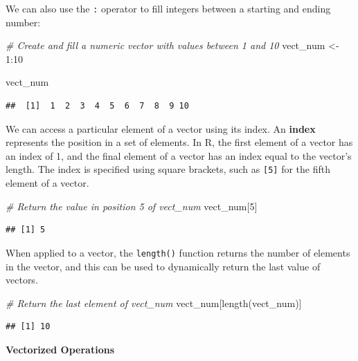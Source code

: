 \documentclass[
]{book}
\newenvironment{Shaded}{\begin{snugshade}}{\end{snugshade}}
\newcommand{\CommentTok}[1]{\textcolor[rgb]{0.56,0.35,0.01}{\textit{#1}}}
\newcommand{\DecValTok}[1]{\textcolor[rgb]{0.00,0.00,0.81}{#1}}
\newcommand{\FunctionTok}[1]{\textcolor[rgb]{0.00,0.00,0.00}{#1}}
\newcommand{\NormalTok}[1]{#1}
\newcommand{\OtherTok}[1]{\textcolor[rgb]{0.56,0.35,0.01}{#1}}
\newcommand{\SpecialCharTok}[1]{\textcolor[rgb]{0.00,0.00,0.00}{#1}}
\begin{document}
We can also use the \texttt{:} operator to fill integers between a starting and ending number:

\begin{Shaded}
\begin{Highlighting}[]
\CommentTok{\# Create and fill a numeric vector with values between 1 and 10}
\NormalTok{vect\_num }\OtherTok{\textless{}{-}} \DecValTok{1}\SpecialCharTok{:}\DecValTok{10}

\NormalTok{vect\_num}
\end{Highlighting}
\end{Shaded}

\begin{verbatim}
##  [1]  1  2  3  4  5  6  7  8  9 10
\end{verbatim}

We can access a particular element of a vector using its index. An \textbf{index} represents the position in a set of elements. In R, the first element of a vector has an index of 1, and the final element of a vector has an index equal to the vector's length. The index is specified using square brackets, such as \texttt{{[}5{]}} for the fifth element of a vector.

\begin{Shaded}
\begin{Highlighting}[]
\CommentTok{\# Return the value in position 5 of vect\_num}
\NormalTok{vect\_num[}\DecValTok{5}\NormalTok{]}
\end{Highlighting}
\end{Shaded}

\begin{verbatim}
## [1] 5
\end{verbatim}

When applied to a vector, the \texttt{length()} function returns the number of elements in the vector, and this can be used to dynamically return the last value of vectors.

\begin{Shaded}
\begin{Highlighting}[]
\CommentTok{\# Return the last element of vect\_num}
\NormalTok{vect\_num[}\FunctionTok{length}\NormalTok{(vect\_num)]}
\end{Highlighting}
\end{Shaded}

\begin{verbatim}
## [1] 10
\end{verbatim}

\textbf{Vectorized Operations}
\end{document}
